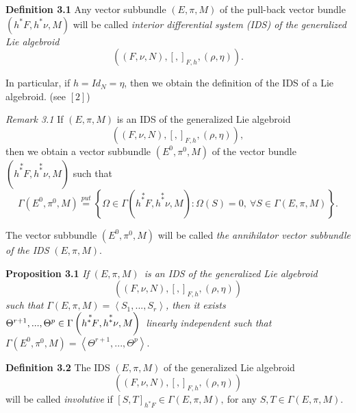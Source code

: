 \documentclass[11pt]{article}
\begin{document}
\textbf{Definition 3.1 }Any vector subbundle $\left( E,\pi ,M\right) $ of
the pull-back vector bundle $\left( h^{\ast }F,h^{\ast }\nu ,M\right) $ will
be called \emph{interior differential system (IDS) of the generalized Lie
algebroid }%
\begin{equation*}
\left( \left( F,\nu ,N\right) ,\left[ ,\right] _{F,h},\left( \rho ,\eta
\right) \right) .
\end{equation*}

In particular, if $h=Id_{N}=\eta $, then we obtain the definition of the IDS
of a Lie algebroid. (see $\left[ {2}\right] $)

\emph{Remark 3.1 }If $\left( E,\pi ,M\right) $ is an IDS of the generalized
Lie algebroid
\begin{equation*}
\left( \left( F,\nu ,N\right) ,\left[ ,\right] _{F,h},\left( \rho ,\eta
\right) \right) ,
\end{equation*}%
then we obtain a vector subbundle $\left( E^{0},\pi ^{0},M\right) $ of the
vector bundle $\left( \overset{\ast }{h^{\ast }F},\overset{\ast }{h^{\ast
}\nu },M\right) $ such that
\begin{equation*}
\Gamma \left( E^{0},\pi ^{0},M\right) \overset{put}{=}\left\{ \Omega \in
\Gamma \left( \overset{\ast }{h^{\ast }F},\overset{\ast }{h^{\ast }\nu }%
,M\right) :\Omega \left( S\right) =0,~\forall S\in \Gamma \left( E,\pi
,M\right) \right\} .
\end{equation*}

The vector subbundle $\left( E^{0},\pi ^{0},M\right) $ will be called \emph{%
the annihilator vector subbundle of the IDS }$\left( E,\pi ,M\right) .$

\textbf{Proposition 3.1 }\emph{If }$\left( E,\pi ,M\right) $\emph{\ is an
IDS of the generalized Lie algebroid }%
\begin{equation*}
\left( \left( F,\nu ,N\right) ,\left[ ,\right] _{F,h},\left( \rho ,\eta
\right) \right)
\end{equation*}%
\emph{such that }$\Gamma \left( E,\pi ,M\right) =\left\langle
S_{1},...,S_{r}\right\rangle $\emph{, then it exists }$\Theta
^{r+1},...,\Theta ^{p}\in \Gamma \left( \overset{\ast }{h^{\ast }F},\overset{%
\ast }{h^{\ast }\nu },M\right) $\emph{\ linearly independent such that }$%
\Gamma \left( E^{0},\pi ^{0},M\right) =\left\langle \Theta ^{r+1},...,\Theta
^{p}\right\rangle .$

\textbf{Definition 3.2 }The IDS $\left( E,\pi ,M\right) $ of the generalized
Lie algebroid
\begin{equation*}
\left( \left( F,\nu ,N\right) ,\left[ ,\right] _{F,h},\left( \rho ,\eta
\right) \right)
\end{equation*}%
will be called \emph{involutive} if $\left[ S,T\right] _{h^{\ast }F}\in
\Gamma \left( E,\pi ,M\right) ,~$for any $S,T\in \Gamma \left( E,\pi
,M\right) .$
\end{document}
